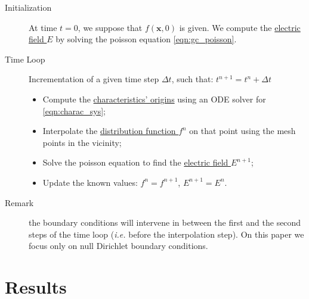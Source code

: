 \documentclass[proc]{edpsmath}
\begin{document}
\begin{description}
	\item[Initialization] At time $t=0$, we suppose that $f(\mathbf{x}, 0)$ is given. We compute the \underline{electric field $E$} by solving the poisson equation \eqref{eqn:gc_poisson}.
	\item[Time Loop] Incrementation of a given time step $\Delta t$, such that: $t^{n+1} = t^n + \Delta t$
		\begin{itemize}
		\item Compute the \underline{characteristics' origins} using an ODE solver for \eqref{eqn:charac_sys};
		\item Interpolate the \underline{distribution function $f^n$} on that point using the mesh points in the vicinity;
		\item Solve the poisson equation to find the \underline{electric field $E^{n+1}$};
		\item Update the known values: $f^n = f^{n+1}$, $E^{n+1}=E^n$.
		\end{itemize}
	\item[Remark] the boundary conditions will intervene in between the first and the second steps of the time loop (\emph{i.e.} before the interpolation step). On this paper we focus only on null Dirichlet boundary conditions.
\end{description}


\section{Results}
\label{sec:results}




\newpage


\end{document}
